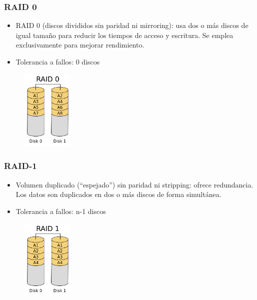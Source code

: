 \documentclass{beamer}
\begin{document}
\begin{frame}
  \frametitle{RAID 0}

  \begin{itemize}
    \item \alert{RAID 0} (discos divididos sin paridad ni \alert{mirroring}): usa dos o más discos de igual tamaño para reducir los tiempos de acceso y escritura. Se emplea exclusivamente para mejorar rendimiento.
    \item Tolerancia a fallos: 0 discos
  \end{itemize}

\begin{figure}[h]
\begin{center}
  \includegraphics[width=2.5cm]{figs/RAID_0.png}
\end{center}
\end{figure}

\end{frame}

\begin{frame}
  \frametitle{RAID-1}

  \begin{itemize}
    \item Volumen duplicado (``espejado'') sin paridad ni stripping: ofrece redundancia. Los datos son duplicados en dos o más discos de forma simultánea.
    \item Tolerancia a fallos: n-1 discos
  \end{itemize}

\begin{figure}[h]
\begin{center}
  \includegraphics[width=2.5cm]{figs/RAID_1.png}
\end{center}
\end{figure}

\end{frame}
\end{document}
